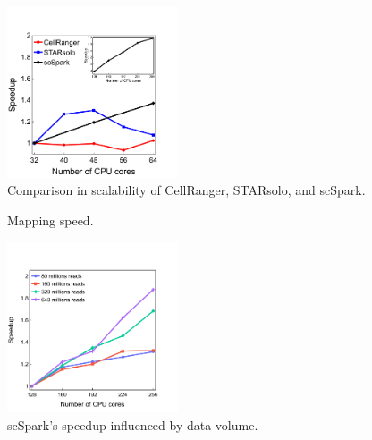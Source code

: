 \documentclass[conference]{IEEEtran}
\begin{document}
\begin{figure}
	\centering
	\includegraphics[width=0.45\textwidth]{fig3.pdf}
	\caption{Comparison in scalability of CellRanger, STARsolo, and scSpark.}
	\label{fig3}
\end{figure}
\begin{figure}
	\centering
	\caption{Mapping speed.}
	\label{fig4}
\end{figure}
\begin{figure}
	\centering
	\includegraphics[width=0.45\textwidth]{fig5.pdf}
	\caption{scSpark's speedup influenced by data volume.} \label{fig5}
\end{figure}
\end{document}
